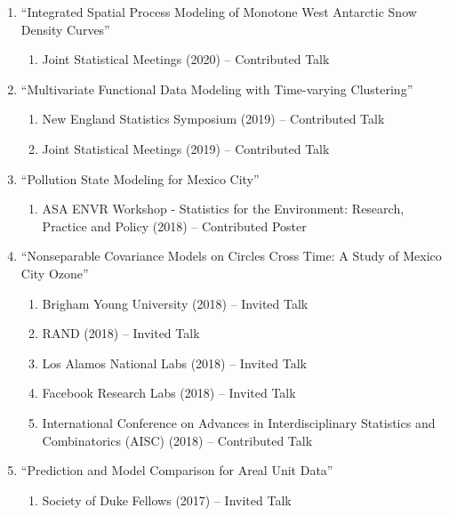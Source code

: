 \documentclass[12pt]{article}
\begin{document}
\begin{enumerate}[label=$\bullet$]
\item ``Integrated Spatial Process Modeling of Monotone West Antarctic Snow Density Curves''
\begin{enumerate}[label=$\cdot$]
\item Joint Statistical Meetings (2020) -- Contributed Talk
\end{enumerate}
\item ``Multivariate Functional Data Modeling with Time-varying Clustering''
\begin{enumerate}[label=$\cdot$]
\item New England Statistics Symposium (2019) -- Contributed Talk
\item Joint Statistical Meetings (2019) -- Contributed Talk
\end{enumerate}
\item ``Pollution State Modeling for Mexico City''
\begin{enumerate}[label=$\cdot$]
\item ASA ENVR Workshop - Statistics for the Environment: Research, Practice and Policy (2018) -- Contributed Poster
\end{enumerate}
\item ``Nonseparable Covariance Models on Circles Cross Time: A Study of Mexico City Ozone''
\begin{enumerate}[label=$\cdot$]
\item Brigham Young University (2018) -- Invited Talk
\item RAND (2018) -- Invited Talk
\item Los Alamos National Labs (2018) -- Invited Talk
\item Facebook Research Labs (2018) -- Invited Talk
\item International Conference on Advances in Interdisciplinary Statistics and Combinatorics (AISC) (2018) -- Contributed Talk
\end{enumerate}
\item ``Prediction and Model Comparison for Areal Unit Data''
\begin{enumerate}[label=$\cdot$]
\item Society of Duke Fellows (2017) -- Invited Talk
\end{enumerate}

\end{enumerate}
\end{document}
